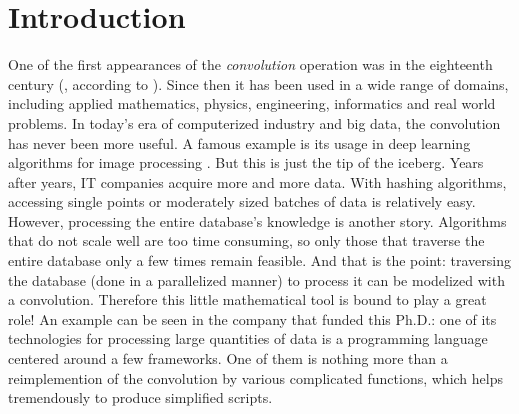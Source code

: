 \chapter*{Introduction}\label{chp:int}

One of the first appearances of the \emph{convolution} operation was in the eighteenth century (\cite{d1754traite}, according to \cite{dominguezorigin}). Since then it has been used in a wide range of domains, including applied mathematics, physics, engineering, informatics and real world problems. In today's era of computerized industry and big data, the convolution has never been more useful. A famous example is its usage in deep learning algorithms for image processing \citep{lecun2015deep}. But this is just the tip of the iceberg. Years after years, IT companies acquire more and more data. With hashing algorithms, accessing single points or moderately sized batches of data is relatively easy. However, processing the entire database's knowledge is another story. Algorithms that do not scale well are too time consuming, so only those that traverse the entire database only a few times remain feasible. And that is the point: traversing the database (done in a parallelized manner) to process it can be modelized with a convolution. Therefore this little mathematical tool is bound to play a great role! %
An example can be seen in the company that funded this Ph.D.: one of its technologies for processing large quantities of data is a programming language centered around a few frameworks. One of them %
is nothing more than a reimplemention of the convolution by various complicated functions, which helps tremendously to produce simplified scripts.


